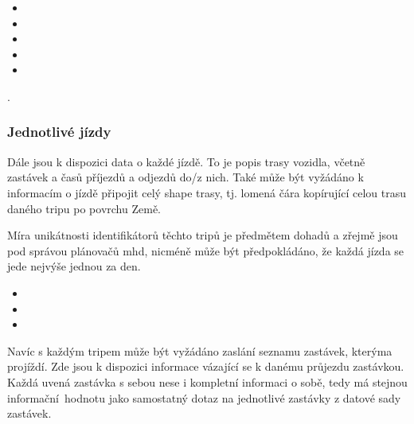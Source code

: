 \begin{itemize}
	\item {}

	\item {}

	\item {}

	\item {}

	\item {}
\end{itemize}.

\subsubsection{Jednotlivé jízdy}

Dále jsou k dispozici data o každé jízdě. To je popis trasy vozidla, včetně zastávek a časů příjezdů a odjezdů do/z nich. Také může být vyžádáno k informacím o jízdě připojit celý shape trasy, tj. lomená čára kopírující celou trasu daného tripu po povrchu Země.

\bigbreak

 Míra unikátnosti identifikátorů těchto tripů je předmětem dohadů a zřejmě jsou pod správou plánovačů \gls{mhd}, nicméně může být předpokládáno, že každá jízda se jede nejvýše jednou za den.

\begin{itemize}
	\item {}

	\item {}

	\item {}
\end{itemize}

Navíc s každým tripem může být vyžádáno zaslání seznamu zastávek, kterýma projíždí. Zde jsou k dispozici informace vázající se k danému průjezdu zastávkou. Každá uvená zastávka s sebou nese i kompletní informaci o sobě, tedy má stejnou informační hodnotu jako samostatný dotaz na jednotlivé zastávky z datové sady zastávek.

